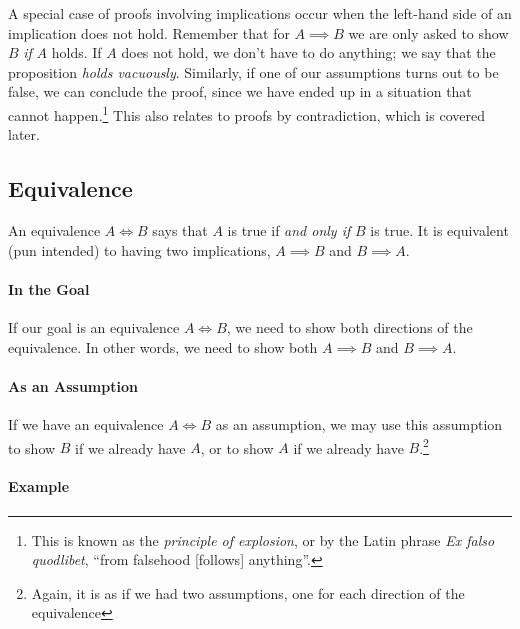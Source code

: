 \documentclass{tufte-handout}
\begin{document}
\noindent
A special case of proofs involving implications occur when the
left-hand side of an implication does not hold. Remember that for
$A \implies B$ we are only asked to show $B$ \emph{if} $A$ holds.
If $A$ does not hold, we don't have to do anything; we say that
the proposition \emph{holds vacuously}. Similarly, if one of our
assumptions turns out to be false, we can conclude the proof,
since we have ended up in a situation that cannot
happen.\footnote{This is known as the \emph{principle of
    explosion}, or by the Latin phrase \emph{Ex falso quodlibet},
  ``from falsehood [follows] anything''.} This also relates to
proofs by contradiction, which is covered later.


\subsection{Equivalence}

An equivalence $A \iff B$ says that $A$ is true if \emph{and only
  if} $B$ is true. It is equivalent (pun intended) to having
two implications, $A \implies B$ and $B \implies A$.

\paragraph{In the Goal}
If our goal is an equivalence $A \iff B$, we need to show both
directions of the equivalence. In other words, we need to show
both $A \implies B$ and $B \implies A$.

\paragraph{As an Assumption}
If we have an equivalence $A \iff B$ as an assumption, we may use
this assumption to show $B$ if we already have $A$, or to show $A$
if we already have $B$.\footnote{Again, it is as if we had two
  assumptions, one for each direction of the equivalence}

\paragraph{Example}
\end{document}
